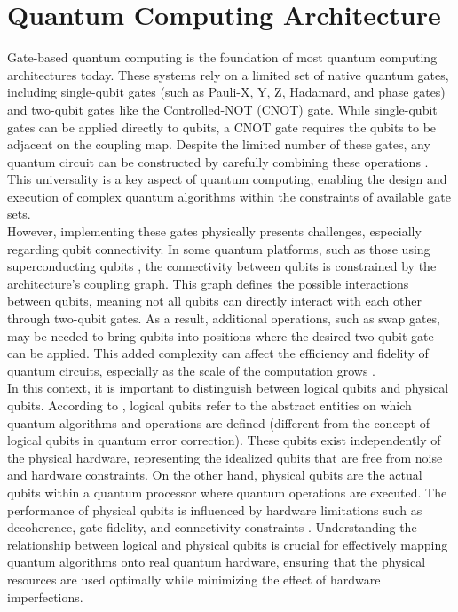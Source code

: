 \newpage
\section{Quantum Computing Architecture} %
Gate-based quantum computing is the foundation of most quantum computing architectures today. These systems rely on a limited set of native quantum gates, including single-qubit gates (such as Pauli-X, Y, Z, Hadamard, and phase gates) and two-qubit gates like the Controlled-NOT (CNOT) gate.  While single-qubit gates can be applied directly to qubits, a CNOT gate requires the qubits to be adjacent on the coupling map. Despite the limited number of these gates, any quantum circuit can be constructed by carefully combining these operations \cite{barenco_elementary_1995}. This universality is a key aspect of quantum computing, enabling the design and execution of complex quantum algorithms within the constraints of available gate sets. \\
However, implementing these gates physically presents challenges, especially regarding qubit connectivity. In some quantum platforms, such as those using superconducting qubits \cite{krantz_quantum_2019}, the connectivity between qubits is constrained by the architecture's coupling graph. This graph defines the possible interactions between qubits, meaning not all qubits can directly interact with each other through two-qubit gates. As a result, additional operations, such as swap gates, may be needed to bring qubits into positions where the desired two-qubit gate can be applied. This added complexity can affect the efficiency and fidelity of quantum circuits, especially as the scale of the computation grows \cite{khandavilli_towards_2023}. \\
In this context, it is important to distinguish between logical qubits and physical qubits. According to \citeauthor{itoko_optimization_2020}, logical qubits refer to the abstract entities on which quantum algorithms and operations are defined (different from the concept of logical qubits in quantum error correction). These qubits exist independently of the physical hardware, representing the idealized qubits that are free from noise and hardware constraints. On the other hand, physical qubits are the actual qubits within a quantum processor where quantum operations are executed. The performance of physical qubits is influenced by hardware limitations such as decoherence, gate fidelity, and connectivity constraints \cite{itoko_optimization_2020}. Understanding the relationship between logical and physical qubits is crucial for effectively mapping quantum algorithms onto real quantum hardware, ensuring that the physical resources are used optimally while minimizing the effect of hardware imperfections. \\
